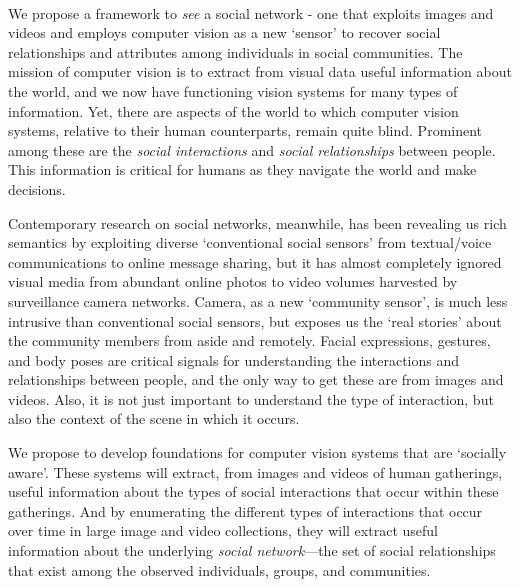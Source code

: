 \pagestyle{empty}

{\centering \vspace*{-0.3in} {\bf \Large{\mytitle}\\}}
\vspace*{0.05in}

We propose a framework to \emph{see} a social network - one that exploits images and videos and employs computer vision as a new `sensor' to recover social relationships and attributes among individuals in social communities. The mission of computer vision is to extract from visual data useful information about the world, and we now have functioning vision systems for many types of information. Yet, there are aspects of the world to which computer vision systems, relative to their human counterparts, remain quite blind. Prominent among these are the \emph{social interactions} and \emph{social relationships} between people. This information is critical for humans as they navigate the world and make decisions.

Contemporary research on social networks, meanwhile, has been revealing us rich semantics by exploiting diverse `conventional social sensors' from textual/voice communications to online message sharing, but it has almost completely ignored visual media from abundant online photos to video volumes harvested by surveillance camera networks. Camera, as a new `community sensor', is much less intrusive than conventional social sensors, but exposes us the `real stories' about the community members from aside and remotely. Facial expressions, gestures, and body poses are critical signals for understanding the interactions and relationships between people, and the only way to get these are from images and videos. Also, it is not just important to understand the type of interaction, but also the context of the scene in which it occurs.

We propose to develop foundations for computer vision systems that are `socially aware'. These systems will extract, from images and videos of human gatherings, useful information about the types of social interactions that occur within these gatherings. And by enumerating the different types of interactions that occur over time in large image and video collections, they will extract useful information about the underlying \emph{social network}---the set of social relationships that exist among the observed individuals, groups, and communities. 

